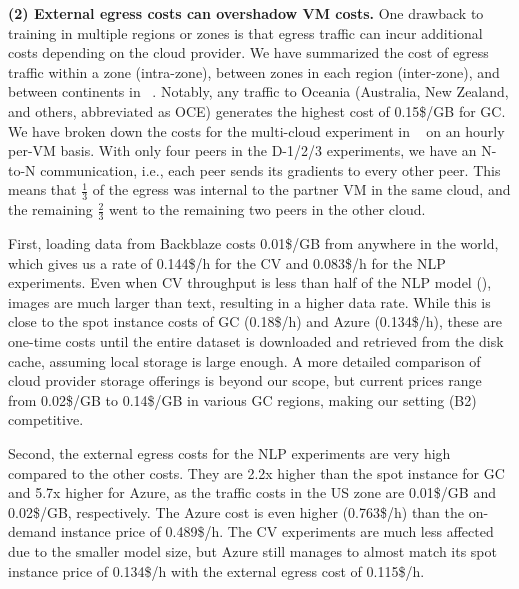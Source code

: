 \textbf{(2) External egress costs can overshadow VM costs.} One drawback to training in multiple regions or zones is that egress traffic can incur additional costs depending on the cloud provider.
We have summarized the cost of egress traffic within a zone (intra-zone), between zones in each region (inter-zone), and between continents in ~. 
Notably, any traffic to Oceania (Australia, New Zealand, and others, abbreviated as OCE) generates the highest cost of 0.15\$/GB for GC.
We have broken down the costs for the multi-cloud experiment in ~ on an hourly per-VM basis. 
With only four peers in the D-1/2/3 experiments, we have an N-to-N communication, i.e., each peer sends its gradients to every other peer.
This means that $\frac{1}{3}$ of the egress was internal to the partner VM in the same cloud, and the remaining $\frac{2}{3}$ went to the remaining two peers in the other cloud.

First, loading data from Backblaze costs 0.01\$/GB from anywhere in the world, which gives us a rate of 0.144\$/h for the CV and 0.083\$/h for the NLP experiments.
Even when CV throughput is less than half of the NLP model (), images are much larger than text, resulting in a higher data rate.
While this is close to the spot instance costs of GC (0.18\$/h) and Azure (0.134\$/h), these are one-time costs until the entire dataset is downloaded and retrieved from the disk cache, assuming local storage is large enough.
A more detailed comparison of cloud provider storage offerings is beyond our scope, but current prices range from 0.02\$/GB to 0.14\$/GB in various GC regions, making our setting (B2) competitive.

Second, the external egress costs for the NLP experiments are very high compared to the other costs.
They are 2.2x higher than the spot instance for GC and 5.7x higher for Azure, as the traffic costs in the US zone are 0.01\$/GB and 0.02\$/GB, respectively.
The Azure cost is even higher (0.763\$/h) than the on-demand instance price of 0.489\$/h.
The CV experiments are much less affected due to the smaller model size, but Azure still manages to almost match its spot instance price of 0.134\$/h with the external egress cost of 0.115\$/h.

